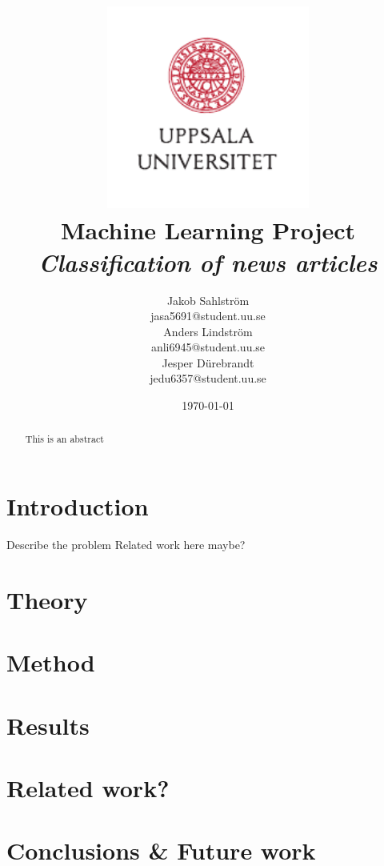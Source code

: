 \documentclass[11pt, a4paper]{article}
\title{
\includegraphics[width=0.5\textwidth]{../img/uu-logo.pdf}\\
Machine Learning Project\\ \Large \emph{Classification of news articles}}
\author{Jakob Sahlström \\ \scriptsize{jasa5691@student.uu.se} \\
Anders Lindström \\ \scriptsize{anli6945@student.uu.se} \\
Jesper Dürebrandt \\ \scriptsize{jedu6357@student.uu.se}}
\date{\today} %
\begin{document}
\maketitle
\thispagestyle{empty}
\newpage
\setcounter{page}{1}
\begin{abstract}
This is an abstract
\end{abstract}
\newpage
\tableofcontents
\newpage
\section{Introduction}
Describe the problem 
Related work here maybe?
\section{Theory}
\section{Method}
\section{Results}
\section{Related work?}
\section{Conclusions \& Future work}
\begin{thebibliography}{99}
\end{thebibliography}
\end{document}
